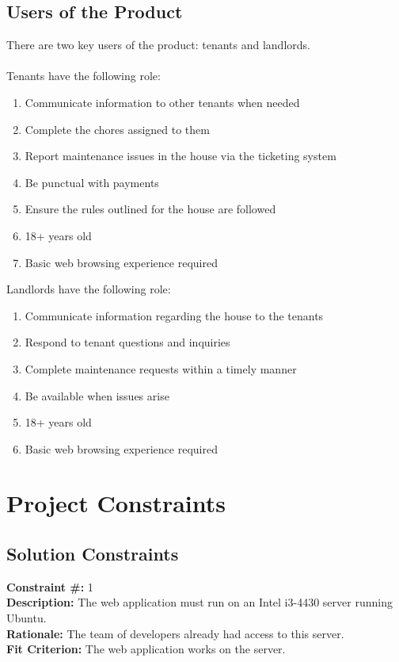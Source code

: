 \documentclass[12pt]{article}
\begin{document}
\subsection{Users of the Product}
There are two key users of the product: tenants and landlords. \\ \\
Tenants have the following role:
\begin{enumerate}
\item Communicate information to other tenants when needed
\item Complete the chores assigned to them
\item Report maintenance issues in the house via the ticketing system
\item Be punctual with payments
\item Ensure the rules outlined for the house are followed
\item 18+ years old
\item Basic web browsing experience required
\end{enumerate}
Landlords have the following role:
\begin{enumerate}
\item Communicate information regarding the house to the tenants
\item Respond to tenant questions and inquiries
\item Complete maintenance requests within a timely manner
\item Be available when issues arise
\item 18+ years old
\item Basic web browsing experience required
\end{enumerate}


\section{Project Constraints} 
	
\subsection{Solution Constraints}
\textbf{Constraint \#:} 1 \\
\textbf{Description: } The web application must run on an Intel i3-4430 server running Ubuntu. \\
\textbf{Rationale: } The team of developers already had access to this server. \\
\textbf{Fit Criterion: } The web application works on the server.
\end{document}
